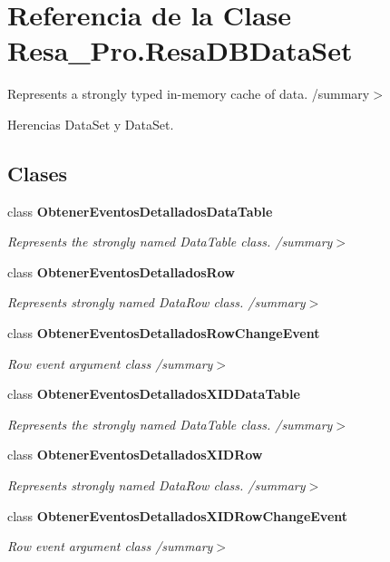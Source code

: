 \section{Referencia de la Clase Resa\+\_\+\+Pro.\+Resa\+D\+B\+Data\+Set}
\label{class_resa___pro_1_1_resa_d_b_data_set}


Represents a strongly typed in-\/memory cache of data. /summary$>$  




Herencias Data\+Set y Data\+Set.

\subsection*{Clases}
\begin{DoxyCompactItemize}
\item 
class {\bf Obtener\+Eventos\+Detallados\+Data\+Table}
\begin{DoxyCompactList}\small\item\em Represents the strongly named Data\+Table class. /summary$>$ \end{DoxyCompactList}\item 
class {\bf Obtener\+Eventos\+Detallados\+Row}
\begin{DoxyCompactList}\small\item\em Represents strongly named Data\+Row class. /summary$>$ \end{DoxyCompactList}\item 
class {\bf Obtener\+Eventos\+Detallados\+Row\+Change\+Event}
\begin{DoxyCompactList}\small\item\em Row event argument class /summary$>$ \end{DoxyCompactList}\item 
class {\bf Obtener\+Eventos\+Detallados\+X\+I\+D\+Data\+Table}
\begin{DoxyCompactList}\small\item\em Represents the strongly named Data\+Table class. /summary$>$ \end{DoxyCompactList}\item 
class {\bf Obtener\+Eventos\+Detallados\+X\+I\+D\+Row}
\begin{DoxyCompactList}\small\item\em Represents strongly named Data\+Row class. /summary$>$ \end{DoxyCompactList}\item 
class {\bf Obtener\+Eventos\+Detallados\+X\+I\+D\+Row\+Change\+Event}
\begin{DoxyCompactList}\small\item\em Row event argument class /summary$>$ \end{DoxyCompactList}\end{DoxyCompactItemize}
